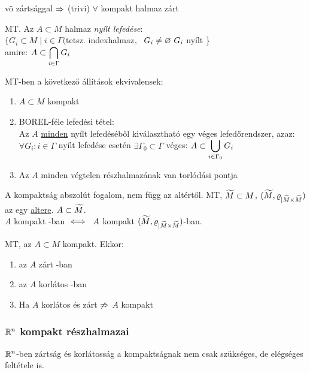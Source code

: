 \begin{megj}
  vö zártsággal $\Rightarrow$ (trivi) $\forall$ kompakt halmaz zárt
\end{megj}

\begin{de}\MT MT. Az $A\subset M$ halmaz \emph{nyílt lefedése}:\\
  $\{G_i\subset M\mid  i\in \Gamma ($tetsz. indexhalmaz$,\ \ G_i
  \neq \varnothing\ G_i$ nyílt \}\\
  amire: $\displaystyle A\subset \bigcap_{i\in\Gamma}G_i$
\end{de}
\begin{te}\MT MT-ben a
  következő állítások ekvivalensek:
  \begin{enumerate}
  \item $A\subset M$ kompakt
  \item BOREL-féle lefedési tétel:\\
    Az $A$ \underline{minden} nyílt lefedéséből kiválasztható
    egy véges lefedőrendszer, azaz: $\forall{G_i : i\in \Gamma}$
    nyílt lefedése esetén $\exists \Gamma_0\subset\Gamma$ véges:
    $\displaystyle A\subset\bigcup_{i\in\Gamma_0}G_i$
  \item Az $A$ minden  végtelen részhalmazának van torlódási pontja
  \end{enumerate}
\end{te}

\begin{megj}
  A kompaktság abszolút fogalom, nem függ az altértől. \MT MT,
  $\widetilde{M}\subset M$,
  $(\widetilde{M},\varrho_{|\widetilde{M}\times\widetilde{M}})$ az \MT egy
  \underline{altere}. $A\subset \widetilde{M}$.\\
  $A$ kompakt \MT-ban $\iff\ A$ kompakt
  $(\widetilde{M},\varrho_{|\widetilde{M}\times\widetilde{M}})$-ban.
\end{megj}

\begin{te} \MT MT, az $A\subset M$
  kompakt. Ekkor:
  \begin{enumerate}
  \item az $A$ zárt \MT-ban
  \item az $A$ korlátos \MT-ban
  \item Ha $A$ korlátos és zárt  $\not\Rightarrow$ $A$ kompakt
  \end{enumerate}    
\end{te}

\subsubsection{$\mathbb{R}^n$ kompakt részhalmazai}
$\mathbb{R}^n$-ben zártság és korlátosság a kompaktságnak nem csak
szükséges, de elégséges feltétele is.

